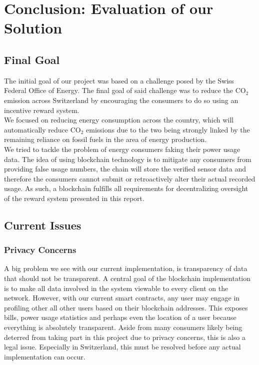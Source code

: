 \documentclass[11pt]{article}
\begin{document}
\pagebreak
\section{Conclusion: Evaluation of our Solution}

\subsection{Final Goal}
The initial goal of our project was based on a challenge posed by the Swiss Federal Office of Energy. The final goal of said challenge was to reduce the CO$_2$ emission across Switzerland by encouraging the consumers to do so using an incentive reward system.\\
We focused on reducing energy consumption across the country, which will automatically reduce CO$_2$ emissions due to the two being strongly linked by the remaining reliance on fossil fuels in the area of energy production.\\
We tried to tackle the problem of energy consumers faking their power usage data. The idea of using blockchain technology is to mitigate any consumers from providing false usage numbers, the chain will store the verified sensor data and therefore the consumers cannot submit or retroactively alter their actual recorded usage. As such, a blockchain fulfills all requirements for decentralizing oversight of the reward system presented in this report.
\subsection{Current Issues}
\subsubsection{Privacy Concerns} \label{subsec:privacy}
A big problem we see with our current implementation, is transparency of data that should not be transparent. A central goal of the blockchain implementation is to make all data involved in the system viewable to every client on the network. However, with our current smart contracts, any user may engage in profiling other all other users based on their blockchain addresses. This exposes bills, power usage statistics and perhaps even the location of a user because everything is absolutely transparent. Aside from many consumers likely being deterred from taking part in this project due to privacy concerns, this is also a legal issue. Especially in Switzerland, this must be resolved before any actual implementation can occur.
\end{document}
